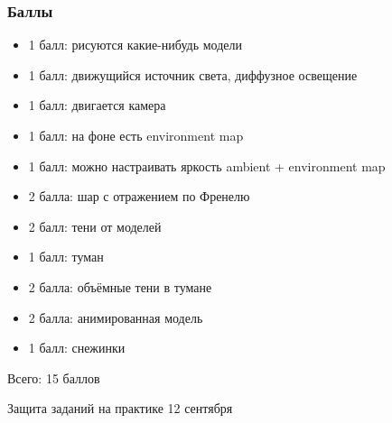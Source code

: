 \documentclass{beamer}
\begin{document}
\begin{frame}[fragile]
\frametitle{Баллы}
\begin{itemize}
\item 1 балл: рисуются какие-нибудь модели
\item 1 балл: движущийся источник света, диффузное освещение
\item 1 балл: двигается камера
\item 1 балл: на фоне есть environment map
\item 1 балл: можно настраивать яркость ambient + environment map
\item 2 балла: шар с отражением по Френелю
\item 2 балл: тени от моделей
\item 1 балл: туман
\item 2 балла: объёмные тени в тумане
\item 2 балла: анимированная модель
\item 1 балл: снежинки
\end{itemize}
Всего: 15 баллов

Защита заданий на практике 12 сентября
\end{frame}
\end{document}

